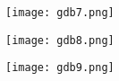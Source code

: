 \documentclass[12pt]{article}
\begin{document}
\begin{figure}
    \centering
    \texttt{[image: gdb7.png]}
    \caption{}
\end{figure}

\begin{figure}
    \centering
    \texttt{[image: gdb8.png]}
    \caption{}
\end{figure}

\begin{figure}
    \centering
    \texttt{[image: gdb9.png]}
    \caption{}
\end{figure}
\end{document}
